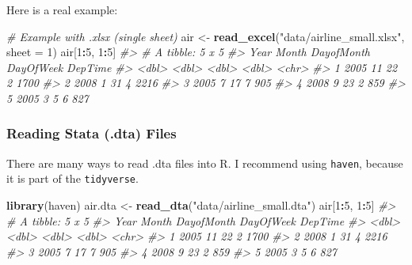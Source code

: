 \documentclass[]{book}
\newenvironment{Shaded}{\begin{snugshade}}{\end{snugshade}}
\newcommand{\KeywordTok}[1]{\textcolor[rgb]{0.13,0.29,0.53}{\textbf{#1}}}
\newcommand{\DataTypeTok}[1]{\textcolor[rgb]{0.13,0.29,0.53}{#1}}
\newcommand{\DecValTok}[1]{\textcolor[rgb]{0.00,0.00,0.81}{#1}}
\newcommand{\StringTok}[1]{\textcolor[rgb]{0.31,0.60,0.02}{#1}}
\newcommand{\CommentTok}[1]{\textcolor[rgb]{0.56,0.35,0.01}{\textit{#1}}}
\newcommand{\OperatorTok}[1]{\textcolor[rgb]{0.81,0.36,0.00}{\textbf{#1}}}
\newcommand{\NormalTok}[1]{#1}
\begin{document}
Here is a real example:

\begin{Shaded}
\begin{Highlighting}[]
\CommentTok{# Example with .xlsx (single sheet)}
\NormalTok{air <-}\StringTok{ }\KeywordTok{read_excel}\NormalTok{(}\StringTok{"data/airline_small.xlsx"}\NormalTok{, }\DataTypeTok{sheet =} \DecValTok{1}\NormalTok{) }
\NormalTok{air[}\DecValTok{1}\OperatorTok{:}\DecValTok{5}\NormalTok{, }\DecValTok{1}\OperatorTok{:}\DecValTok{5}\NormalTok{]}
\CommentTok{#> # A tibble: 5 x 5}
\CommentTok{#>    Year Month DayofMonth DayOfWeek DepTime}
\CommentTok{#>   <dbl> <dbl>      <dbl>     <dbl> <chr>  }
\CommentTok{#> 1  2005    11         22         2 1700   }
\CommentTok{#> 2  2008     1         31         4 2216   }
\CommentTok{#> 3  2005     7         17         7 905    }
\CommentTok{#> 4  2008     9         23         2 859    }
\CommentTok{#> 5  2005     3          5         6 827}
\end{Highlighting}
\end{Shaded}

\subsubsection*{Reading Stata (.dta)
Files}\label{reading-stata-.dta-files}

There are many ways to read .dta files into R. I recommend using
\texttt{haven}, because it is part of the \texttt{tidyverse}.

\begin{Shaded}
\begin{Highlighting}[]
\KeywordTok{library}\NormalTok{(haven)}
\NormalTok{air.dta <-}\StringTok{ }\KeywordTok{read_dta}\NormalTok{(}\StringTok{"data/airline_small.dta"}\NormalTok{) }
\NormalTok{air[}\DecValTok{1}\OperatorTok{:}\DecValTok{5}\NormalTok{, }\DecValTok{1}\OperatorTok{:}\DecValTok{5}\NormalTok{]}
\CommentTok{#> # A tibble: 5 x 5}
\CommentTok{#>    Year Month DayofMonth DayOfWeek DepTime}
\CommentTok{#>   <dbl> <dbl>      <dbl>     <dbl> <chr>  }
\CommentTok{#> 1  2005    11         22         2 1700   }
\CommentTok{#> 2  2008     1         31         4 2216   }
\CommentTok{#> 3  2005     7         17         7 905    }
\CommentTok{#> 4  2008     9         23         2 859    }
\CommentTok{#> 5  2005     3          5         6 827}
\end{Highlighting}
\end{Shaded}
\end{document}
